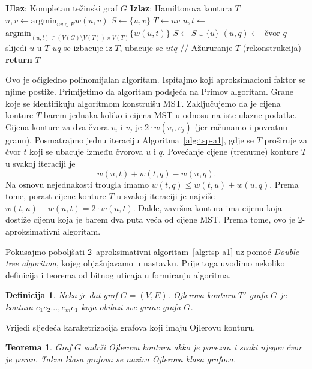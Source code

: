 \documentclass[a4paper, utf8, 11pt, colorlinks]{book}
\newtheorem{definition}{Definicija}
\newtheorem{thm}{Teorema}
\begin{document}
   \begin{algorithm}[!t] 
  
  	\begin{algorithmic}[1]
  		\STATE \textbf{Ulaz}: Kompletan težinski graf $G$
  		\STATE \textbf{Izlaz}: Hamiltonova kontura $T$  
  		\STATE $u,v \gets \mbox{argmin}_{uv \in E} w(u,v)$
  		\STATE $S \gets \{u,v\}$
  		\STATE $T \gets uv$
  		\STATE $u,t \gets$ $\mbox{argmin}_{(u,t) \in (V(G)\setminus V(T)) \times V(T)} \{w(u, t)\}$
  		\STATE $ S \gets S \cup \{u\}$ 
  		\STATE $(u, q)\gets$ čvor $q$ slijedi $u$ u  $T$
  		\STATE  $uq$ se izbacuje iz $T$, ubacuje se $utq$  // Ažururanje $T$ (rekonstrukcija)
  		\ENDWHILE
  		\STATE \textbf{return} $T$
  	\end{algorithmic}
   	\caption{Aproksimativni algoritam 1 za TSP.}
   	\label{alg:tsp-a1}
  \end{algorithm}

 Ovo je očigledno polinomijalan algoritam. Ispitajmo koji aproksimacioni faktor se 
njime postiže. Primijetimo da algoritam podsjeća na Primov algoritam. Grane koje se identifikuju algoritmom 
konstruišu MST. Zaključujemo da je cijena konture $T$ barem jednaka koliko i cijena MST u odnosu na iste ulazne podatke. Cijena konture za dva čvora $v_i$ i $v_j$ je $2 \cdot w({v_i,v_j})$ (jer računamo i povratnu granu). Posmatrajmo jednu iteraciju Algoritma~\ref{alg:tsp-a1}, gdje se $T$
proširuje za čvor $t$ koji se ubacuje između čvorova  $u$ i $q$. Povećanje cijene (trenutne) konture $T$ u svakoj iteraciji je $$w({u,t}) + w({t,q})-w({u,q}).$$
Na osnovu nejednakosti trougla imamo $ w({t,q}) \leq w({t,u}) + w({u,q})$. Prema tome, porast cijene konture $T$ u svakoj iteraciji je najviše $ w({t, u}) + w({u,t}) = 2\cdot w({u,t})$. 
Dakle, završna kontura ima cijenu koja dostiže cijenu koja je barem dva puta veća od cijene MST. Prema tome, ovo je 2-aproksimativni algoritam. 

 \noindent Pokusajmo poboljšati 2--aproksimativni algoritam~\ref{alg:tsp-a1} uz pomoć \emph{Double tree algoritma}, kojeg objašnjavamo u nastavku. Prije toga uvodimo nekoliko definicija i teorema od bitnog uticaja u formiranju algoritma. 
 \begin{definition}
 	  Neka je dat graf $G=(V,E)$. Ojlerova konturu $T^o$ grafa $G$ je kontura $e_1e_2...,e_me_1$ koja obilazi sve grane grafa $G$. 
 \end{definition}
Vrijedi sljedeća karaketrizacija grafova koji imaju Ojlerovu konturu. 
\begin{thm}
	 Graf $G$ sadrži Ojlerovu konturu akko je povezan i svaki njegov čvor je paran. Takva klasa grafova se naziva Ojlerova klasa grafova.
\end{thm}
\end{document}
